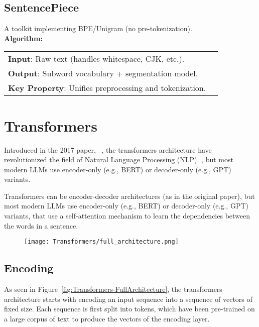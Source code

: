 \subsection{SentencePiece}\label{Section2.1.5}
    A toolkit implementing BPE/Unigram (no pre-tokenization). \\
    \textbf{Algorithm:} \\
    \begin{tabular}{ll}  
        \textbf{Input}: Raw text (handles whitespace, CJK, etc.).  \\
        \textbf{Output}: Subword vocabulary + segmentation model.  \\
        \textbf{Key Property}: Unifies preprocessing and tokenization.  \\
    \end{tabular}  


\section{Transformers}\label{Section2.2}
Introduced in the 2017 paper, ~\citet{AttentionIsAllYouNeed},
the transformers architecture have revolutionized the field of Natural Language Processing (NLP).
, but most modern LLMs use encoder-only (e.g., BERT) or decoder-only (e.g., GPT) variants.

Transformers can be encoder-decoder architectures (as in the original paper), but most modern LLMs use encoder-only (e.g., BERT) or decoder-only (e.g., GPT) variants, that use a self-attention mechanism to learn the dependencies between the words in a sentence.

\begin{figure}
    \centering
      \texttt{[image: Transformers/full\_architecture.png]}
\end{figure}


\subsection{Encoding}\label{Section2.2.1}
As seen in Figure~\ref{fig:Transformers-FullArchitecture}, the transformers architecture starts with encoding an input sequence into a sequence of vectors of fixed size. Each sequence is first split into tokens, which have been pre-trained on a large corpus of text to produce the vectors of the encoding layer.


